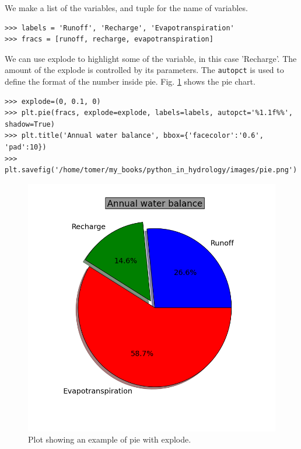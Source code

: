 \documentclass[10pt]{book}
\begin{document}
{We make a list of the variables, and tuple for the name of variables. 
\beforeverb \begin{verbatim}
>>> labels = 'Runoff', 'Recharge', 'Evapotranspiration'
>>> fracs = [runoff, recharge, evapotranspiration]
\end{verbatim} \afterverb

We can use explode to highlight some of the variable, in this case 'Recharge'. The amount of the explode is controlled by its parameters. The \verb"autopct" is used to define the format of the number inside pie. Fig. \ref{fig:pie} shows the pie chart. 
\beforeverb \begin{verbatim}
>>> explode=(0, 0.1, 0)
>>> plt.pie(fracs, explode=explode, labels=labels, autopct='%1.1f%%', shadow=True)
>>> plt.title('Annual water balance', bbox={'facecolor':'0.6', 'pad':10})
>>> plt.savefig('/home/tomer/my_books/python_in_hydrology/images/pie.png')
\end{verbatim} \afterverb

\beforefig
\begin{figure}[h!]
  \centering
    \includegraphics[scale=0.5]{images/pie.png}
  \caption{Plot showing an example of pie with explode.}
   \label{fig:pie}
\end{figure}
\afterfig

}
\end{document}
